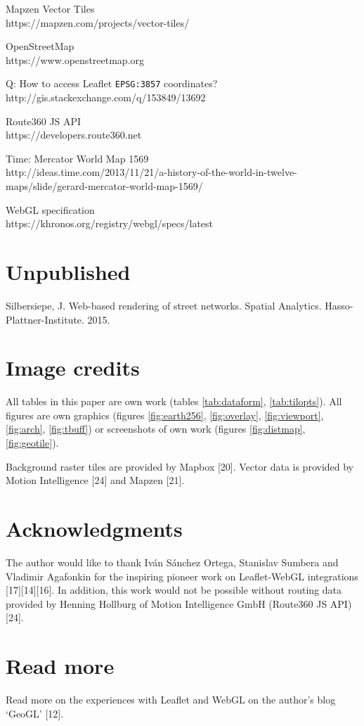 \documentclass{motivation}
\begin{document}
\begin{enumerate}[{[1]}]
  \item Mapzen Vector Tiles\\
    https://mapzen.com/projects/vector-tiles/
  \item OpenStreetMap\\
    https://www.openstreetmap.org
  \item Q: How to access Leaflet \texttt{EPSG:3857} coordinates?\\
    http://gis.stackexchange.com/q/153849/13692
  \item Route360 JS API\\
    https://developers.route360.net
  \item Time: Mercator World Map 1569\\
    http://ideas.time.com/2013/11/21/a-history-of-the-world-in-twelve-maps/slide/gerard-mercator-world-map-1569/
  \item WebGL specification\\
    https://khronos.org/registry/webgl/specs/latest
  \end{enumerate}

\section{Unpublished}
  \begin{enumerate}[{[1]}]
  \setcounter{enumi}{26}
  \item Silbersiepe, J. Web-based rendering of street networks. Spatial Analytics. Hasso-Plattner-Institute. 2015.
  \end{enumerate}

\section{Image credits}
  All tables in this paper are own work (tables \ref{tab:dataform}, \ref{tab:tilopts}). All figures are own graphics (figures \ref{fig:earth256}, \ref{fig:overlay}, \ref{fig:viewport}, \ref{fig:arch}, \ref{fig:tbuff}) or screenshots of own work (figures \ref{fig:distmap}, \ref{fig:geotile}).\par

  Background raster tiles are provided by Mapbox [20]. Vector data is provided by Motion Intelligence [24] and Mapzen [21].

\section{Acknowledgments}
  The author would like to thank Iván Sánchez Ortega, Stanis\-lav Sumbera and Vladimir Agafonkin for the inspiring pioneer work on Leaflet-WebGL integrations [17][14][16]. In addition, this work would not be possible without routing data provided by Henning Hollburg of Motion Intelligence GmbH (Route360 JS API) [24].

\section{Read more}
  Read more on the experiences with Leaflet and WebGL on the author's blog `GeoGL' [12].

\balancecolumns
\end{document}
